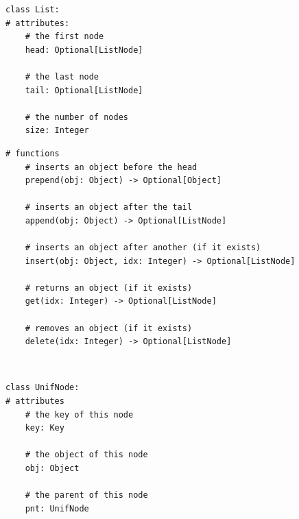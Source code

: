 \documentclass[mathserif, handout]{beamer}
\begin{document}
\begin{frame}[fragile]
  \begin{thmboxside}
    \begin{lstlisting}[style=mypython, firstnumber=last]
class List:
# attributes:
    # the first node
    head: Optional[ListNode]
    
    # the last node
    tail: Optional[ListNode]
    
    # the number of nodes
    size: Integer
\end{lstlisting}
  \end{thmboxside}
\end{frame}

\begin{frame}[fragile]
  \begin{thmboxbot}
    \begin{lstlisting}[style=mypython, firstnumber=last]
# functions
    # inserts an object before the head
    prepend(obj: Object) -> Optional[Object]
    
    # inserts an object after the tail
    append(obj: Object) -> Optional[ListNode]
    
    # inserts an object after another (if it exists)
    insert(obj: Object, idx: Integer) -> Optional[ListNode]
    
    # returns an object (if it exists)
    get(idx: Integer) -> Optional[ListNode]
    
    # removes an object (if it exists)
    delete(idx: Integer) -> Optional[ListNode]
\end{lstlisting}
  \end{thmboxbot}
\end{frame}


\begin{frame}[fragile]
  \begin{thmboxtop}
     \\
    \begin{lstlisting}[style=mypython]
class UnifNode:
# attributes
    # the key of this node
    key: Key
    
    # the object of this node
    obj: Object

    # the parent of this node
    pnt: UnifNode
\end{lstlisting}
  \end{thmboxtop}
\end{frame}
\end{document}

